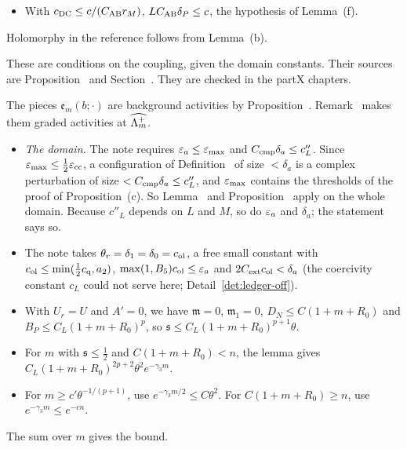 \begin{detail}
\begin{step}[(DC5) arithmetic]
\begin{itemize}
\item With $c_{\rm DC}\le c/(C_{\rm AB}r_M)$, $LC_{\rm AB}\delta_P\le c$, the hypothesis of Lemma~(f).
\end{itemize}
Holomorphy in the reference follows from Lemma~(b).
\end{step}
\begin{step}[(iii)]
These are conditions on the coupling, given the domain constants. Their sources are Proposition~ and Section~. They are checked in the partX chapters.
\end{step}
\end{detail}

\begin{detail}\label{d8:oneloop}
The pieces $\mathfrak e_m(b;\cdot)$ are background activities by Proposition~. Remark~ makes them graded activities at $\widehat{\Lambda_m^+}$.
\begin{itemize}
\item \emph{The domain.} The note requires $\varepsilon_a\le\varepsilon_{\max}$ and $C_{\rm cmp}\delta_a\le c''_L$. Since $\varepsilon_{\max}\le\frac12\varepsilon_{\rm cc}$, a configuration of Definition~ of size $<\delta_a$ is a complex perturbation of size $<C_{\rm cmp}\delta_a\le c''_L$, and $\varepsilon_{\max}$ contains the thresholds of the proof of Proposition~(c). So Lemma~ and Proposition~ apply on the whole domain. Because $c''_L$ depends on $L$ and $M$, so do $\varepsilon_a$ and $\delta_a$; the statement says so.
\item The note takes $\theta_r=\delta_1=\delta_0=c_{\rm ol}$, a free small constant with $c_{\rm ol}\le\min(\frac12c_{\rm q},a_2)$, $\max(1,B_5)c_{\rm ol}\le\varepsilon_a$ and $2C_{\rm ext}c_{\rm ol}<\delta_a$ (the coercivity constant $c_L$ could not serve here; Detail~\ref{det:ledger-off}).
\item With $U_r=U$ and $A'=0$, we have $\mathfrak m=0$, $\mathfrak m_1=0$, $D_N\le C(1+m+R_0)$ and $B_P\le C_L(1+m+R_0)^p$, so $\mathfrak s\le C_L(1+m+R_0)^{p+1}\theta$.
\item For $m$ with $\mathfrak s\le\frac12$ and $C(1+m+R_0)<n$, the lemma gives $C_L(1+m+R_0)^{2p+2}\theta^2e^{-\gamma_3m}$.
\item For $m\ge c'\theta^{-1/(p+1)}$, use $e^{-\gamma_3m/2}\le C\theta^2$. For $C(1+m+R_0)\ge n$, use $e^{-\gamma_3m}\le e^{-cn}$.
\end{itemize}
The sum over $m$ gives the bound.
\end{detail}


